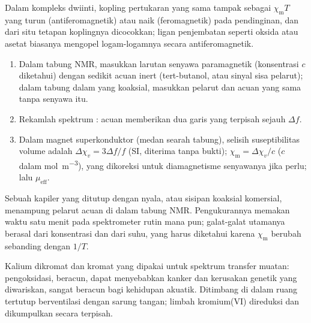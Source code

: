 Dalam kompleks dwiinti, kopling pertukaran yang sama tampak sebagai $\chi_{\mathrm m}T$ yang turun
(antiferomagnetik) atau naik (feromagnetik) pada pendinginan, dan dari situ tetapan
koplingnya dicocokkan; ligan penjembatan seperti oksida atau asetat biasanya
mengopel logam-logamnya secara antiferomagnetik.

\begin{method}\label{met:b3:complex-spectra-magnetism:evans}
\begin{enumerate}
  \item Dalam tabung NMR, masukkan larutan senyawa paramagnetik (konsentrasi
        $c$ diketahui) dengan sedikit acuan inert (tert-butanol, atau sinyal sisa
        pelarut); dalam tabung dalam yang koaksial, masukkan pelarut dan acuan
        yang sama tanpa senyawa itu.
  \item Rekamlah spektrum : acuan memberikan dua garis yang terpisah sejauh $\Delta f$.
  \item Dalam magnet superkonduktor (medan searah tabung), selisih suseptibilitas
        volume adalah $\Delta\chi_v = 3\Delta f/f$ (SI, diterima tanpa bukti); $\chi_{\mathrm m} = \Delta\chi_v/c$ ($c$ dalam
        \unit{mol.m^{-3}}), yang dikoreksi untuk diamagnetisme senyawanya jika perlu;
        lalu $\mu_{\mathrm{eff}}$.
\end{enumerate}
\end{method}

\begin{inthelab}
Sebuah kapiler yang ditutup dengan nyala, atau sisipan koaksial komersial,
menampung pelarut acuan di dalam tabung NMR. Pengukurannya memakan waktu satu
menit pada spektrometer rutin mana pun; galat-galat utamanya berasal dari
konsentrasi dan dari suhu, yang harus diketahui karena $\chi_{\mathrm m}$ berubah sebanding dengan $1/T$.
\end{inthelab}

\begin{safety}{}
Kalium dikromat dan kromat yang dipakai untuk spektrum transfer muatan:
pengoksidasi, beracun, dapat menyebabkan kanker dan kerusakan genetik yang
diwariskan, sangat beracun bagi kehidupan akuatik. Ditimbang di dalam ruang
tertutup berventilasi dengan sarung tangan; limbah kromium(VI) direduksi dan
dikumpulkan secara terpisah.
\end{safety}

